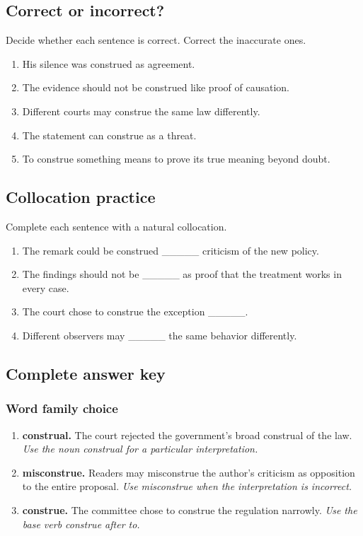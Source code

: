 \documentclass[11pt]{article}
\begin{document}
\subsection{Correct or incorrect?}
Decide whether each sentence is correct. Correct the inaccurate ones.

\begin{enumerate}
  \item His silence was construed as agreement.
  \item The evidence should not be construed like proof of causation.
  \item Different courts may construe the same law differently.
  \item The statement can construe as a threat.
  \item To construe something means to prove its true meaning beyond doubt.
\end{enumerate}

\subsection{Collocation practice}
Complete each sentence with a natural collocation.

\begin{enumerate}
  \item The remark could be construed \_\_\_\_\_ criticism of the new policy.
  \item The findings should not be \_\_\_\_\_ as proof that the treatment works in every case.
  \item The court chose to construe the exception \_\_\_\_\_.
  \item Different observers may \_\_\_\_\_ the same behavior differently.
\end{enumerate}

\subsection{Complete answer key}
\subsubsection{Word family choice}
\begin{enumerate}
  \item \textbf{construal.} The court rejected the government's broad construal of the law. \emph{Use the noun construal for a particular interpretation.}
  \item \textbf{misconstrue.} Readers may misconstrue the author's criticism as opposition to the entire proposal. \emph{Use misconstrue when the interpretation is incorrect.}
  \item \textbf{construe.} The committee chose to construe the regulation narrowly. \emph{Use the base verb construe after to.}
\end{enumerate}
\end{document}
